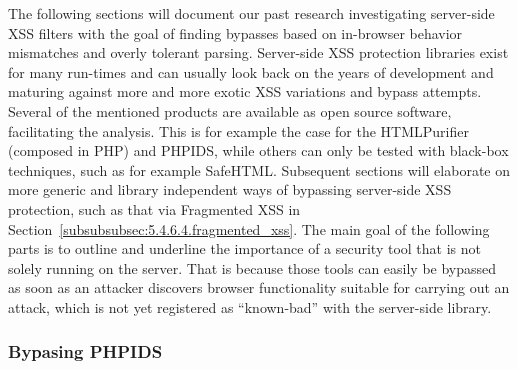       The following sections will document our past research investigating server-side XSS filters with the goal of finding bypasses based on in-browser behavior mismatches and overly tolerant parsing. Server-side XSS protection libraries exist for many run-times and can usually look back on the years of development and maturing against more and more exotic XSS variations and bypass attempts. Several of the mentioned products are available as open source software, facilitating the analysis. This is for example the case for the HTMLPurifier (composed in PHP) and PHPIDS, while others can only be tested with black-box techniques, such as for example SafeHTML. Subsequent sections will elaborate on more generic and library independent ways of bypassing server-side XSS protection, such as that via Fragmented XSS in Section~\ref{subsubsubsec:5.4.6.4.fragmented_xss}. The main goal of the following parts is to outline and underline the importance of a security tool that is not solely running on the server. That is 
because those tools can easily be bypassed as soon as an attacker discovers browser functionality suitable for carrying out an attack, which is not yet registered as ``known-bad'' with the server-side library. 
    
      \subsubsection{Bypasing PHPIDS}
      \label{subsubsubsec:5.4.6.1.bypassing_phpids}

